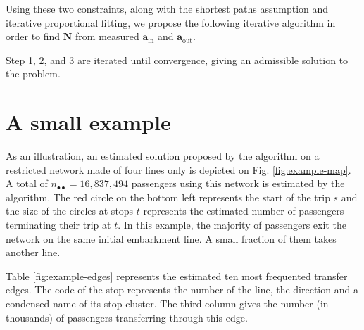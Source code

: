 \documentclass{llncs}
\begin{document}
Using these two constraints, along with the shortest paths assumption and iterative proportional fitting, we propose the following iterative algorithm in order to find $\mathbf{N}$ from measured $\mathbf{a}_\text{in}$ and $\mathbf{a}_\text{out}$. \\

\noindent {}

Step 1, 2, and 3 are iterated until convergence, giving an admissible solution to the problem.
%
\section{A small example}
%

As an illustration, an estimated solution proposed by the algorithm on a restricted network made of four lines only is depicted on Fig. \ref{fig:example-map}. A total of $n_{\bullet \bullet} = 16,837,494$ passengers using this network is estimated by the algorithm. The red circle on the bottom left represents the start of the trip $s$ and the size of the circles at stops $t$ represents the estimated number of passengers terminating their trip at $t$. In this example, the majority of passengers exit the network on the same initial embarkment line. A small fraction of them takes another line. 

Table \ref{fig:example-edges} represents the estimated ten most frequented transfer edges. The code of the stop represents the number of the line, the direction and a condensed name of its stop cluster. The third column gives the number (in thousands) of passengers transferring through this edge.
\end{document}
